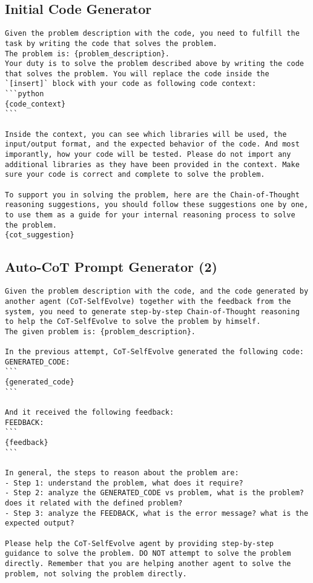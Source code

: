 \subsection{Initial Code Generator}
\label{sec:initial_code_generator}
\begin{verbatim}
Given the problem description with the code, you need to fulfill the task by writing the code that solves the problem.
The problem is: {problem_description}.
Your duty is to solve the problem described above by writing the code that solves the problem. You will replace the code inside the `[insert]` block with your code as following code context:
```python
{code_context}
```

Inside the context, you can see which libraries will be used, the input/output format, and the expected behavior of the code. And most imporantly, how your code will be tested. Please do not import any additional libraries as they have been provided in the context. Make sure your code is correct and complete to solve the problem.

To support you in solving the problem, here are the Chain-of-Thought reasoning suggestions, you should follow these suggestions one by one, to use them as a guide for your internal reasoning process to solve the problem.
{cot_suggestion}
\end{verbatim}

\subsection{Auto-CoT Prompt Generator (2)}
\label{sec:correction_cot}
\begin{verbatim}
Given the problem description with the code, and the code generated by another agent (CoT-SelfEvolve) together with the feedback from the system, you need to generate step-by-step Chain-of-Thought reasoning to help the CoT-SelfEvolve to solve the problem by himself.
The given problem is: {problem_description}.

In the previous attempt, CoT-SelfEvolve generated the following code:
GENERATED_CODE:
```
{generated_code}
```

And it received the following feedback:
FEEDBACK:
```
{feedback}
```

In general, the steps to reason about the problem are:
- Step 1: understand the problem, what does it require?
- Step 2: analyze the GENERATED_CODE vs problem, what is the problem? does it related with the defined problem?
- Step 3: analyze the FEEDBACK, what is the error message? what is the expected output?

Please help the CoT-SelfEvolve agent by providing step-by-step guidance to solve the problem. DO NOT attempt to solve the problem directly. Remember that you are helping another agent to solve the problem, not solving the problem directly.
\end{verbatim}

